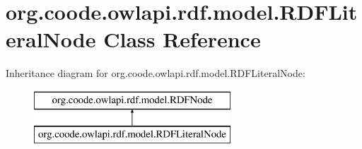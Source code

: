 \hypertarget{classorg_1_1coode_1_1owlapi_1_1rdf_1_1model_1_1_r_d_f_literal_node}{\section{org.\-coode.\-owlapi.\-rdf.\-model.\-R\-D\-F\-Literal\-Node Class Reference}
\label{classorg_1_1coode_1_1owlapi_1_1rdf_1_1model_1_1_r_d_f_literal_node}
}
Inheritance diagram for org.\-coode.\-owlapi.\-rdf.\-model.\-R\-D\-F\-Literal\-Node\-:\begin{figure}[H]
\begin{center}
\leavevmode
\includegraphics[height=2.000000cm]{classorg_1_1coode_1_1owlapi_1_1rdf_1_1model_1_1_r_d_f_literal_node}
\end{center}
\end{figure}
